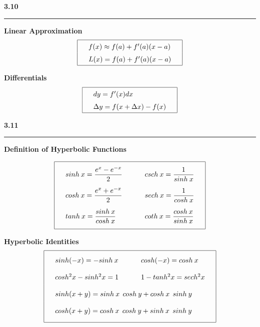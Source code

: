 \documentclass{article}
\begin{document}
\begin{center}
\Large\textbf{3.10}

\noindent\hfill\rule{0.3\textwidth}{.4pt}\hfill
\vspace{12pt}


\large\textbf{Linear Approximation}
\[\arraycolsep=16pt\def\arraystretch{1.5}
\begin{array}{| l |}
	\hline
	f(x) \approx f(a) + f'(a)(x-a) \\
	L(x) = f(a) + f'(a)(x-a) \\
	\hline
\end{array}
\]
\vspace{12pt}

\large\textbf{Differentials}
\[\arraycolsep=16pt\def\arraystretch{1.5}
\begin{array}{| l |}
	\hline
	dy = f'(x)dx \\
	\Delta y = f(x + \Delta x) - f(x) \\
	\hline
\end{array}
\]
\end{center}
\vspace{16pt}

\begin{center}
\Large\textbf{3.11}

\noindent\hfill\rule{0.3\textwidth}{.4pt}\hfill
\vspace{12pt}

\large\textbf{Definition of Hyperbolic Functions}
\begin{large}
\[\arraycolsep=16pt\def\arraystretch{2.5}
\begin{array}{| l l |}
	\hline
	sinh\> x = \dfrac{e^x - e^{-x}}{2} & csch\> x = \dfrac{1}{sinh\> x} \\
	cosh\> x = \dfrac{e^x + e^{-x}}{2} & sech\> x = \dfrac{1}{cosh\> x} \\
	tanh\> x = \dfrac{sinh\> x}{cosh\> x} & coth\> x = \dfrac{cosh\> x}{sinh\> x} \\
	[\medskipamount]	
	\hline
\end{array}
\]
\vspace{12pt}

\large\textbf{Hyperbolic Identities}
\[\arraycolsep=16pt\def\arraystretch{2}
\begin{array}{| l l |}
	\hline
	sinh(-x) = -sinh\> x & cosh(-x) = cosh\> x \\
	cosh^2x - sinh^2 x = 1 & 1 - tanh^2x = sech^2 x \\
	\multicolumn{2}{|l|} {sinh(x+y) = sinh\> x \>\> cosh\> y +cosh\> x \>\> sinh\> y} \\
	\multicolumn{2}{|l|} {cosh(x+y) = cosh\> x \>\> cosh\> y +sinh\> x \>\> sinh\> y} \\
	[\medskipamount]	
	\hline
\end{array}
\]
\end{large}
\end{center}
\pagebreak
\end{document}
